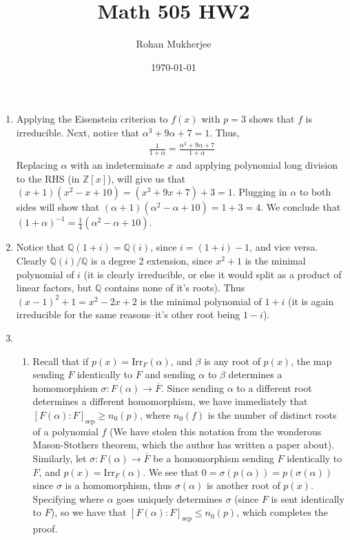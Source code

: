 \documentclass[12pt]{article}
\title{Math 505 HW2}
\date{\today}
\author{Rohan Mukherjee}
\theoremstyle{definitionstyle}
\def\mbb#1{\mathbb{#1}}
\newcommand{\Z}{\mbb Z}
\newcommand{\sepdeg}[1]{[#1]_{\mathrm{sep}}}
\newcommand{\Q}{\mbb Q}
\begin{document}
	\maketitle
	\begin{enumerate}[leftmargin=\labelsep]
		\item Applying the Eisenstein criterion to $f(x)$ with $p = 3$ shows that $f$ is irreducible. Next, notice that $\alpha^3 + 9\alpha + 7 = 1$. Thus, 
		\begin{align*}
			\frac{1}{1+\alpha} = \frac{\alpha^3 + 9\alpha + 7}{1+\alpha}
		\end{align*}
		Replacing $\alpha$ with an indeterminate $x$ and applying polynomial long division to the RHS (in $\Z[x]$), will give us that $(x+1)(x^2-x+10) = (x^3 + 9x + 7) + 3 = 1$. Plugging in $\alpha$ to both sides will show that $(\alpha+1)(\alpha^2-\alpha+10) = 1 + 3 = 4$. We conclude that $(1+\alpha)^{-1} = \frac14(\alpha^2-\alpha+10)$.
		
		\item Notice that $\Q(1+i) = \Q(i)$, since $i = (1 + i) - 1$, and vice versa. Clearly $\Q(i)/\Q$ is a degree 2 extension, since $x^2+1$ is the minimal polynomial of $i$ (it is clearly irreducible, or else it would split as a product of linear factors, but $\Q$ contains none of it's roots). Thus $(x-1)^2 + 1 = x^2 - 2x + 2$ is the minimal polynomial of $1+i$ (it is again irreducible for the same reasons--it's other root being $1-i$).
		
		\item \begin{enumerate}[label=(\arabic*)]
			\item Recall that if $p(x) = \mathrm{Irr}_F(\alpha)$, and $\beta$ is any root of $p(x)$, the map sending $F$ identically to $F$ and sending $\alpha$ to $\beta$ determines a homomorphism $\sigma: F(\alpha) \to \overline F$. Since sending $\alpha$ to a different root determines a different homomorphism, we have immediately that $\sepdeg{F(\alpha) : F} \geq n_0(p)$, where $n_0(f)$ is the number of distinct roots of a polynomial $f$ (We have stolen this notation from the wonderous Mason-Stothers theorem, which the author has written a paper about). Similarly, let $\sigma: F(\alpha) \to \overline F$ be a homomorphism sending $F$ identically to $F$, and $p(x) = \mathrm{Irr}_F(\alpha)$. We see that $0 = \sigma(p(\alpha)) = p(\sigma(\alpha))$ since $\sigma$ is a homomorphism, thus $\sigma(\alpha)$ is another root of $p(x)$. Specifying where $\alpha$ goes uniquely determines $\sigma$ (since $F$ is sent identically to $F$), so we have that $\sepdeg{F(\alpha) : F} \leq n_0(p)$, which completes the proof.
			

\end{enumerate}
\end{enumerate}
\end{document}
